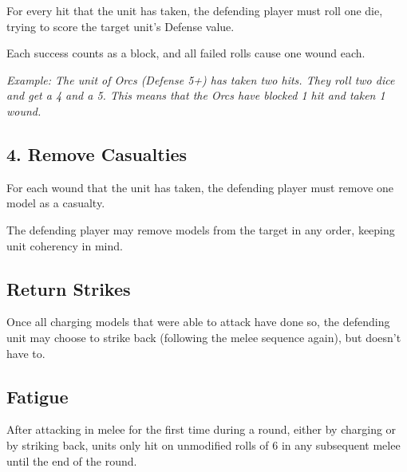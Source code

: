 \documentclass[9pt, a4paper]{extarticle}            %
\begin{document}
\begin{multicols}{2}
For every hit that the unit has taken, the defending player must roll one die, trying to score the target unit’s Defense value.

Each success counts as a block, and all failed rolls cause one wound each.

\textit{Example: The unit of Orcs (Defense 5+) has taken two hits. They roll two dice and get a 4 and a 5. This means that the Orcs have blocked 1 hit and taken 1 wound.}

\subsection{4. Remove Casualties}

For each wound that the unit has taken, the defending player must remove one model as a casualty.

The defending player may remove models from the target in any order, keeping unit coherency in mind.

\subsection{Return Strikes}

Once all charging models that were able to attack have done so, the defending unit may choose to strike back (following the melee sequence again), but doesn’t have to.

\subsection{Fatigue}

After attacking in melee for the first time during a round, either by charging or by striking back, units only hit on unmodified rolls of 6 in any subsequent melee until the end of the round.

\end{multicols}

\newpage



\vspace*{0.2cm}
\end{document}
